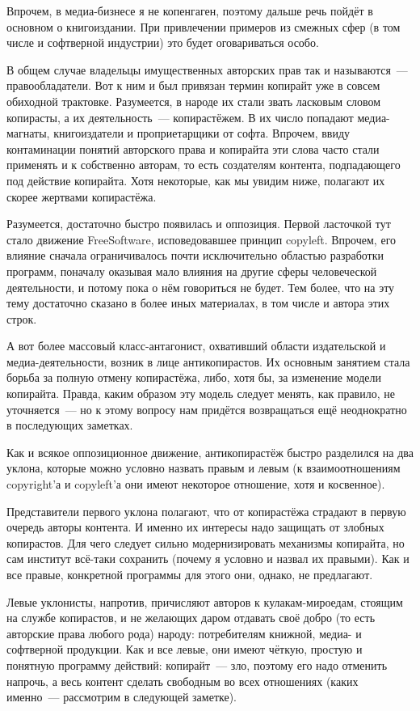 Впрочем, в медиа-бизнесе я не копенгаген, поэтому дальше речь пойдёт в основном о книгоиздании. При привлечении примеров из смежных сфер (в том числе и софтверной индустрии) это будет оговариваться особо.

В общем случае владельцы имущественных авторских прав так и называются~--- правообладатели. Вот к ним и был привязан термин копирайт уже в совсем обиходной трактовке. Разумеется, в народе их стали звать ласковым словом копирасты, а их деятельность~--- копирастёжем. В их число попадают медиа-магнаты, книгоиздатели и проприетарщики от софта. Впрочем, ввиду контаминации понятий авторского права и копирайта эти слова часто стали применять и к собственно авторам, то есть создателям контента, подпадающего под действие копирайта. Хотя некоторые, как мы увидим ниже, полагают их скорее жертвами копирастёжа.

Разумеется, достаточно быстро появилась и оппозиция. Первой ласточкой тут стало движение FreeSoftware, исповедовавшее принцип copyleft. Впрочем, его влияние сначала ограничивалось почти исключительно областью разработки программ, поначалу оказывая мало влияния на другие сферы человеческой деятельности, и потому пока о нём говориться не будет. Тем более, что на эту тему достаточно сказано в более иных материалах, в том числе и автора этих строк.

А вот более массовый класс-антагонист, охвативший области издательской и медиа-деятельности, возник в лице антикопирастов. Их основным занятием стала борьба за полную отмену копирастёжа, либо, хотя бы, за изменение модели копирайта. Правда, каким образом эту модель следует менять, как правило, не уточняется~--- но к этому вопросу нам придётся возвращаться ещё неоднократно в последующих заметках.

Как и всякое оппозиционное движение, антикопирастёж быстро разделился на два уклона, которые можно условно назвать правым и левым (к взаимоотношениям copyright'а и copyleft'а они имеют некоторое отношение, хотя и косвенное).

Представители первого уклона полагают, что от копирастёжа страдают в первую очередь авторы контента. И именно их интересы надо защищать от злобных копирастов. Для чего следует сильно модернизировать механизмы копирайта, но сам институт всё-таки сохранить (почему я условно и назвал их правыми). Как и все правые, конкретной программы для этого они, однако, не предлагают.

Левые уклонисты, напротив, причисляют авторов к кулакам-мироедам, стоящим на службе копирастов, и не желающих даром отдавать своё добро (то есть авторские права любого рода) народу: потребителям книжной, медиа- и софтверной продукции. Как и все левые, они имеют чёткую, простую и понятную программу действий: копирайт~--- зло, поэтому его надо отменить напрочь, а весь контент сделать свободным во всех отношениях (каких именно~--- рассмотрим в следующей заметке).

